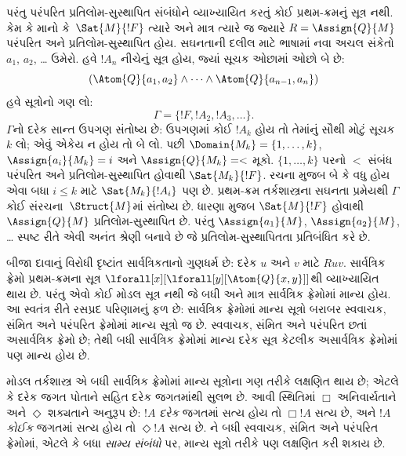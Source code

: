 પરંતુ પરંપરિત પ્રતિલોમ-સુસ્થાપિત સંબંધોને
વ્યાખ્યાયિત કરતું કોઈ પ્રથમ-ક્રમનું સૂત્ર
નથી. કેમ કે માનો કે~$\Sat{M}{!F}$ ત્યારે અને માત્ર
ત્યારે જ જ્યારે $R =
\Assign{Q}{M}$ પરંપરિત અને પ્રતિલોમ-સુસ્થાપિત હોય.
સઘનતાની દલીલ માટે ભાષામાં નવા અચલ સંકેતો
$a_1$, $a_2$, \dots{} ઉમેરો. હવે $!A_n$ નીચેનું
સૂત્ર હોય, જ્યાં સૂચક ઓછામાં ઓછો બે છે:
\[
(\Atom{Q}{a_1,a_2} \land \dots \land
    \Atom{Q}{a_{n-1},a_{n}})
\]
હવે સૂત્રોનો ગણ લો:
\[
\Gamma = \{!F, !A_2, !A_3, \dots\}.
\]
$\Gamma$નો દરેક સાન્ત ઉપગણ સંતોષ્ય છે: ઉપગણમાં
કોઈ $!A_k$ હોય તો તેમાંનું સૌથી મોટું સૂચક $k$
લો; એવું એકેય ન હોય તો બે લો. પછી
$\Domain{M_k} = \{1, \dots, k\}$,
$\Assign{a_i}{M_k} = i$ અને $\Assign{Q}{M_k} = <$ મૂકો.
$\{1,
\dots, k\}$ પરનો $<$ સંબંધ પરંપરિત અને
પ્રતિલોમ-સુસ્થાપિત હોવાથી $\Sat{M_k}{!F}$.
રચના મુજબ બે કે વધુ હોય એવા બધા $i \le k$ માટે
$\Sat{M_k}{!A_i}$ પણ છે.
પ્રથમ-ક્રમ તર્કશાસ્ત્રના સઘનતા પ્રમેયથી $\Gamma$
કોઈ સંરચના~$\Struct{M}$માં સંતોષ્ય છે.
ધારણા મુજબ $\Sat{M}{!F}$ હોવાથી
$\Assign{Q}{M}$ પ્રતિલોમ-સુસ્થાપિત છે. પરંતુ
$\Assign{a_1}{M}$, $\Assign{a_2}{M}$,
\dots{} સ્પષ્ટ રીતે એવી અનંત શ્રેણી બનાવે છે
જે પ્રતિલોમ-સુસ્થાપિતતા પ્રતિબંધિત કરે છે.

બીજા દાવાનું વિરોધી દૃષ્ટાંત સાર્વત્રિકતાનો ગુણધર્મ
છે: દરેક $u$ અને $v$ માટે $Ruv$. સાર્વત્રિક
ફ્રેમો પ્રથમ-ક્રમના સૂત્ર
$\lforall[x][\lforall[y][\Atom{Q}{x,y}]]$થી
વ્યાખ્યાયિત થાય છે. પરંતુ એવો કોઈ મોડલ સૂત્ર
નથી જે બધી અને માત્ર સાર્વત્રિક ફ્રેમોમાં માન્ય હોય.
આ સ્વતંત્ર રીતે રસપ્રદ પરિણામનું ફળ છે: સાર્વત્રિક
ફ્રેમોમાં માન્ય સૂત્રો બરાબર સ્વવાચક, સંમિત અને
પરંપરિત ફ્રેમોમાં માન્ય સૂત્રો જ છે. સ્વવાચક,
સંમિત અને પરંપરિત છતાં અસાર્વત્રિક ફ્રેમો છે;
તેથી બધી સાર્વત્રિક ફ્રેમોમાં માન્ય દરેક સૂત્ર
કેટલીક અસાર્વત્રિક ફ્રેમોમાં પણ માન્ય હોય છે.
\endgroup

\begingroup
\makeatletter{}\makeatother


\label{guunit:OLP-0425}


મોડલ તર્કશાસ્ત્ર  એ બધી સાર્વત્રિક ફ્રેમોમાં
માન્ય સૂત્રોના ગણ તરીકે લક્ષણિત થાય છે;
એટલે કે દરેક જગત પોતાને સહિત દરેક જગતમાંથી
સુલભ છે. આવી સ્થિતિમાં $\Box$ અનિવાર્યતાને
અને $\Diamond$ શક્યતાને અનુરૂપ છે: $!A$ \emph{દરેક}
જગતમાં સત્ય હોય તો $\Box !A$ સત્ય છે, અને $!A$
\emph{કોઈક} જગતમાં સત્ય હોય તો $\Diamond !A$
સત્ય છે. ને બધી સ્વવાચક, સંમિત અને
પરંપરિત ફ્રેમોમાં, એટલે કે બધા \emph{સામ્ય સંબંધો}
પર, માન્ય સૂત્રો તરીકે પણ લક્ષણિત કરી શકાય છે.

